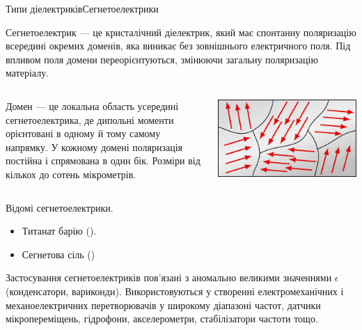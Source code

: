 \documentclass[onlytextwidth]{beamer}
\begin{document}
\begin{frame}{Типи діелектриків}{Сегнетоелектрики}
	\begin{block}{}\justifying
		\alert{Сегнетоелектрик} --- це кристалічний діелектрик, який має \alert{спонтанну поляризацію
			всередині окремих доменів}, яка виникає без зовнішнього електричного поля. Під впливом поля
		домени переорієнтуються, змінюючи загальну поляризацію матеріалу.
	\end{block}

	\begin{columns}
		\begin{column}{0.7\linewidth}
			\begin{block}{}\justifying
				\alert{Домен} --- це локальна область усередині сегнетоелектрика, де дипольні моменти
				орієнтовані в одному й тому самому напрямку. У кожному домені поляризація постійна і спрямована
				в один бік. Розміри від кількох до сотень мікрометрів.
			\end{block}
		\end{column}
        \quad
		\begin{column}{0.3\linewidth}\centering
			\includegraphics[width=1\linewidth]{domains}
		\end{column}
	\end{columns}


	\begin{block}{}\small\justifying
		Відомі сегнетоелектрики.
		\begin{itemize}
			\item Титанат барію ().
			\item Сегнетова сіль ()
		\end{itemize}
		Застосування сегнетоелектриків пов'язані з аномально великими значеннями $\epsilon$
		(конденсатори, вариконди). Використовуються у створенні електромеханічних і механоелектричних
		перетворювачів у широкому діапазоні частот, датчики мікропереміщень, гідрофони, акселерометри,
		стабілізатори частоти тощо.
	\end{block}



\end{frame}
\end{document}
